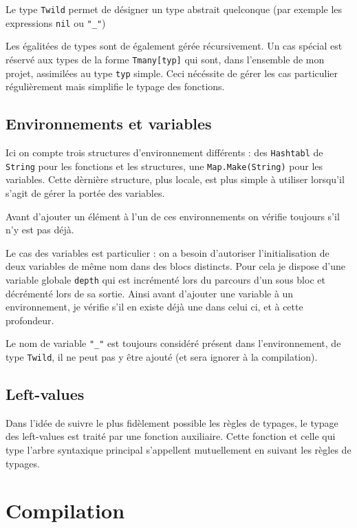 \documentclass[11pt,a4paper]{article}
\begin{document}
Le type \verb|Twild| permet de désigner un type abstrait quelconque (par exemple les expressions \verb|nil| ou \verb|"_"|)

Les égalitées de types sont de également gérée récursivement. Un cas spécial est réservé aux types de la forme \verb|Tmany[typ]| qui sont, dans l'ensemble de mon projet, assimilées au type \verb|typ| simple. Ceci nécéssite de gérer les cas particulier régulièrement mais simplifie le typage des fonctions.

\subsection{Environnements et variables}

Ici on compte trois structures d'environnement différents : des \verb|Hashtabl| de \verb|String| pour les fonctions et les structures, une \verb|Map.Make(String)| pour les variables. Cette dèrnière structure, plus locale, est plus simple à utiliser lorsqu'il s'agit de gérer la portée des variables.

Avant d'ajouter un élément à l'un de ces environnements on vérifie toujours s'il n'y est pas déjà.

Le cas des variables est particulier : on a besoin d'autoriser l'initialisation de deux variables de même nom dans des blocs distincts. Pour cela je dispose d'une variable globale \verb|depth| qui est incrémenté lors du parcours d'un sous bloc et décrémenté lors de sa sortie. Ainsi avant d'ajouter une variable à un environnement, je vérifie s'il en existe déjà une dans celui ci, et à cette profondeur.

Le nom de variable \verb|"_"| est toujours considéré présent dans l'environnement, de type \verb|Twild|, il ne peut pas y être ajouté (et sera ignorer à la compilation).

\subsection{Left-values}

Dans l'idée de suivre le plus fidèlement possible les règles de typages, le typage des left-values est traité par une fonction auxiliaire. Cette fonction et celle qui type l'arbre syntaxique principal s'appellent mutuellement en suivant les règles de typages.

\section{Compilation}
\end{document}
